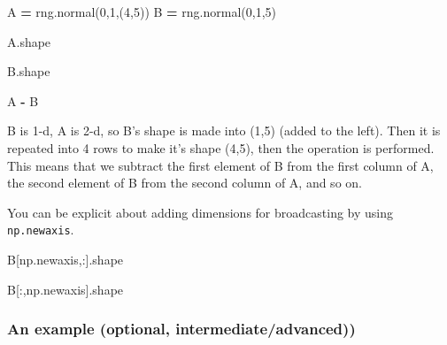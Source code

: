 \documentclass[
  letterpaper,
]{scrbook}
\newenvironment{Shaded}{\begin{snugshade}}{\end{snugshade}}
\newcommand{\DecValTok}[1]{\textcolor[rgb]{0.00,0.00,0.81}{#1}}
\newcommand{\NormalTok}[1]{#1}
\newcommand{\OperatorTok}[1]{\textcolor[rgb]{0.81,0.36,0.00}{\textbf{#1}}}
\begin{document}
\begin{Shaded}
\begin{Highlighting}[]
\NormalTok{A }\OperatorTok{=}\NormalTok{ rng.normal(}\DecValTok{0}\NormalTok{,}\DecValTok{1}\NormalTok{,(}\DecValTok{4}\NormalTok{,}\DecValTok{5}\NormalTok{))}
\NormalTok{B }\OperatorTok{=}\NormalTok{ rng.normal(}\DecValTok{0}\NormalTok{,}\DecValTok{1}\NormalTok{,}\DecValTok{5}\NormalTok{)}
\end{Highlighting}
\end{Shaded}

\begin{Shaded}
\begin{Highlighting}[]
\NormalTok{A.shape}
\end{Highlighting}
\end{Shaded}

\begin{Shaded}
\begin{Highlighting}[]
\NormalTok{B.shape}
\end{Highlighting}
\end{Shaded}

\begin{Shaded}
\begin{Highlighting}[]
\NormalTok{A }\OperatorTok{{-}}\NormalTok{ B}
\end{Highlighting}
\end{Shaded}

B is 1-d, A is 2-d, so B's shape is made into (1,5) (added to the left). Then it is repeated into 4 rows to make it's shape (4,5), then the operation is performed. This means that we subtract the first element of B from the first column of A, the second element of B from the second column of A, and so on.

You can be explicit about adding dimensions for broadcasting by using \texttt{np.newaxis}.

\begin{Shaded}
\begin{Highlighting}[]
\NormalTok{B[np.newaxis,:].shape}
\end{Highlighting}
\end{Shaded}

\begin{Shaded}
\begin{Highlighting}[]
\NormalTok{B[:,np.newaxis].shape}
\end{Highlighting}
\end{Shaded}

\hypertarget{an-example-optional-intermediateadvanced}{%
\subsubsection{An example (optional, intermediate/advanced))}\label{an-example-optional-intermediateadvanced}}
\end{document}
